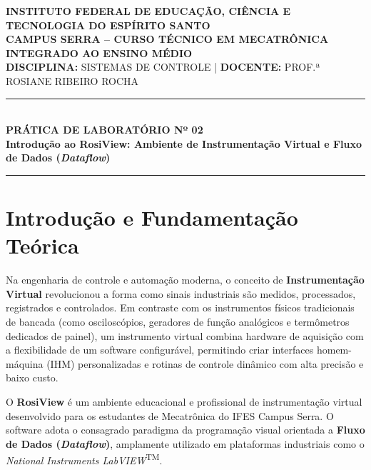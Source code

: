\documentclass[11pt,a4paper]{article}
\begin{document}
\begin{center}
    \vspace*{-0.5cm}
    {\large \textbf{INSTITUTO FEDERAL DE EDUCAÇÃO, CIÊNCIA E TECNOLOGIA DO ESPÍRITO SANTO}}\\[0.04cm]
    {\small \textbf{CAMPUS SERRA -- CURSO TÉCNICO EM MECATRÔNICA INTEGRADO AO ENSINO MÉDIO}}\\[0.06cm]
    {\small \textbf{DISCIPLINA:} SISTEMAS DE CONTROLE \quad | \quad \textbf{DOCENTE:} PROF.ª ROSIANE RIBEIRO ROCHA}\\[0.12cm]
    \rule{\textwidth}{1.2pt}\\[0.12cm]
    {\Large \textbf{\textcolor{ifesNavy}{PRÁTICA DE LABORATÓRIO Nº 02}}}\\[0.06cm]
    {\large \textbf{Introdução ao RosiView: Ambiente de Instrumentação Virtual e Fluxo de Dados (\textit{Dataflow})}}\\[0.12cm]
    \rule{\textwidth}{0.6pt}
\end{center}

\vspace{-0.15cm}

\section{Introdução e Fundamentação Teórica}

Na engenharia de controle e automação moderna, o conceito de \textbf{Instrumentação Virtual} revolucionou a forma como sinais industriais são medidos, processados, registrados e controlados. Em contraste com os instrumentos físicos tradicionais de bancada (como osciloscópios, geradores de função analógicos e termômetros dedicados de painel), um instrumento virtual combina hardware de aquisição com a flexibilidade de um software configurável, permitindo criar interfaces homem-máquina (IHM) personalizadas e rotinas de controle dinâmico com alta precisão e baixo custo.

O \textbf{RosiView} é um ambiente educacional e profissional de instrumentação virtual desenvolvido para os estudantes de Mecatrônica do IFES Campus Serra. O software adota o consagrado paradigma da programação visual orientada a \textbf{Fluxo de Dados (\textit{Dataflow})}, amplamente utilizado em plataformas industriais como o \textit{National Instruments LabVIEW}\textsuperscript{TM}.
\end{document}
